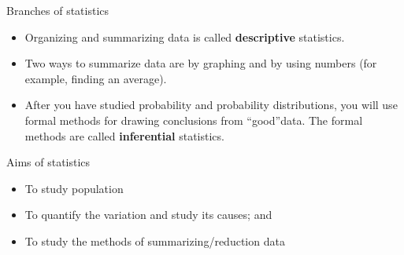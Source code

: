 \documentclass[
  ignorenonframetext,
  aspectratio=169]{beamer}
\providecommand{\tightlist}{%
  \setlength{\itemsep}{0pt}\setlength{\parskip}{0pt}}
\begin{document}
\begin{frame}{Branches of statistics}
\protect\hypertarget{branches-of-statistics}{}
\begin{itemize}
\tightlist
\item
  Organizing and summarizing data is called \textbf{descriptive}
  statistics.
\item
  Two ways to summarize data are by graphing and by using numbers (for
  example, finding an average).
\item
  After you have studied probability and probability distributions, you
  will use formal methods for drawing conclusions from ``good''data. The
  formal methods are called \textbf{inferential} statistics.
\end{itemize}
\end{frame}

\begin{frame}{Aims of statistics}
\protect\hypertarget{aims-of-statistics}{}
\begin{itemize}
\tightlist
\item
  To study population
\item
  To quantify the variation and study its causes; and
\item
  To study the methods of summarizing/reduction data
\end{itemize}
\end{frame}
\end{document}

